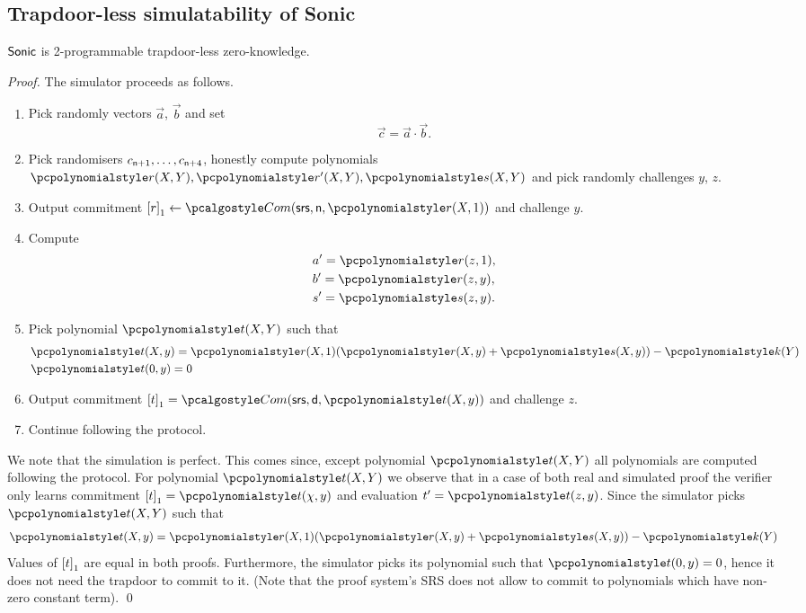 \subsection{Trapdoor-less simulatability of Sonic}
\begin{lemma}
\label{lem:sonic_hvzk}
${\textnormal{\textsf{Sonic}}}$ is 2-programmable trapdoor-less zero-knowledge.
\end{lemma}
\begin{proof}
  The simulator proceeds as follows.
  \begin{enumerate}
  \item Pick randomly vectors $\vec{a}$, $\vec{b}$ and set
    \begin{equation}
      \label{eq:ab_eq_c}
      \vec{c} = \vec{a} \cdot \vec{b}. 
    \end{equation}
  \item Pick randomisers $c_{\mathsf{n} + 1}, \ldots, c_{\mathsf{n} + 4}$,
    honestly compute polynomials $\p{r}(X, Y), \p{r'}(X, Y), \p{s}(X, Y)$ and
    pick randomly challenges $y$, $z$.
  \item Output commitment $\gone{r} \gets \com(\srs, \multconstr, \p{r} (X,
    1))$ and challenge $y$. 
  \item Compute
    \begin{align*}
      & a' = \p{r}(z, 1),\\
      & b' = \p{r}(z, y),\\
      & s' = \p{s}(z, y).
    \end{align*} 
  \item Pick polynomial $\p{t}(X, Y)$ such that
    \begin{align*}
      & \p{t} (X, y) = \p{r} (X, 1) (\p{r}(X, y) + \p{s} (X, y)) - \p{k} (Y)\\
      & \p{t} (0, y) = 0
    \end{align*}
  \item Output commitment $\gone{t} = \com (\srs, \dconst, \p{t} (X, y))$ and
    challenge $z$.
  \item Continue following the protocol.
  \end{enumerate}

  We note that the simulation is perfect. This comes since, except polynomial
  $\p{t} (X, Y)$ all polynomials are computed following the protocol. For
  polynomial $\p{t} (X, Y)$ we observe that in a case of both real and simulated
  proof the verifier only learns commitment $\gone{t} = \p{t} (\chi, y)$ and
  evaluation $t' = \p{t} (z, y)$. Since the simulator picks $\p{t} (X, Y)$ such
  that 
  \begin{align*}
      \p{t} (X, y) = \p{r} (X, 1) (\p{r}(X, y) + \p{s} (X, y)) - \p{k} (Y)
  \end{align*}
  Values of $\left[t\right]_{1}$ are equal in both proofs.
  Furthermore, the simulator picks its polynomial such that $\p{t}(0, y) = 0$,
  hence it does not need the trapdoor to commit to it. (Note that the proof
  system's SRS does not allow to commit to polynomials which have non-zero
  constant term). \qed
\end{proof}
